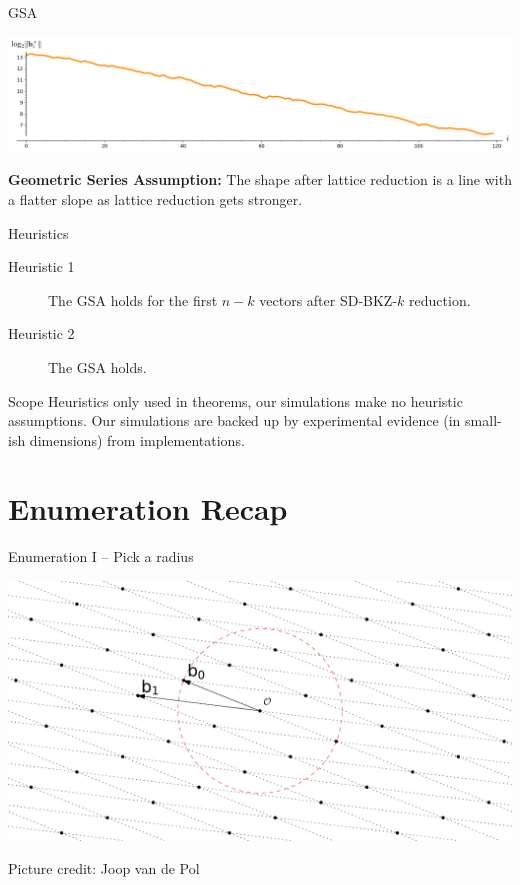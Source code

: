 \documentclass[xcolor=table,10pt,aspectratio=169]{beamer}
\begin{document}
\begin{frame}[label={sec:org30cc5c9}]{GSA}
\begin{center}
\includegraphics[width=.9\linewidth]{gram-schmidt-norms-lll.png}
\end{center}

\textbf{Geometric Series Assumption:} The shape after lattice reduction is a line with a flatter slope as lattice reduction gets stronger.
\end{frame}

\begin{frame}[label={sec:org4e5058d}]{Heuristics}
\begin{description}
\item[{Heuristic 1}] The GSA holds for the first \(n-k\) vectors after SD-BKZ-\(k\) reduction.
\item[{Heuristic 2}] The GSA holds.
\end{description}

\begin{block}{Scope}
Heuristics only used in theorems, our simulations make no heuristic assumptions. Our simulations are backed up by experimental evidence (in small-ish dimensions) from implementations.
\end{block}
\end{frame}

\section{Enumeration Recap}
\label{sec:orgbecb4f1}
\begin{frame}[label={sec:orgd8c22c7}]{Enumeration I -- Pick a radius}
\begin{center}
\includegraphics[width=.9\linewidth]{./joop-enum1.pdf}
\end{center}

\tiny Picture credit: Joop van de Pol
\end{frame}
\end{document}
